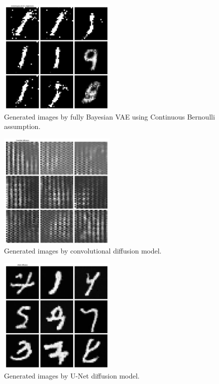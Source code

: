\begin{appendices}
\begin{figure}[H]
    \centering
    \includegraphics[width=0.5\textwidth]{code/figs/mnist-bayes-cb-h2--reconstruction.png}
    \caption{Generated images by fully Bayesian VAE using Continuous Bernoulli assumption.}
    \label{fig:BVAE-CB-images}
\end{figure}

\begin{figure}[H]
    \centering
    \includegraphics[width=0.5\textwidth]{code/figs/convnet-reconstruction.png}
    \caption{Generated images by convolutional diffusion model.}
    \label{fig:ConvDiffusion-images}
\end{figure}

\begin{figure}[H]
    \centering
    \includegraphics[width=0.5\textwidth]{code/figs/UNet-reconstruction.png}
    \caption{Generated images by U-Net diffusion model.}
    \label{fig:UNetDiffusion-images}
\end{figure}






\end{appendices}
